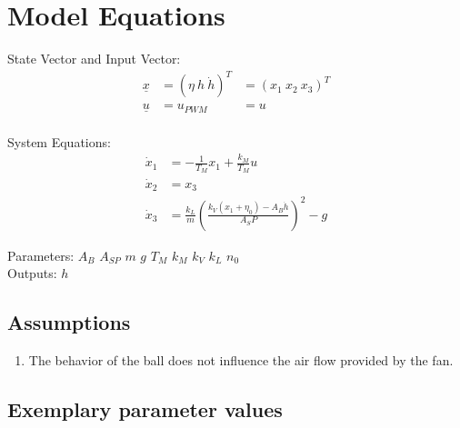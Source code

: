 \documentclass[10pt,a4paper]{article}
\begin{document}
	
	\section{Model Equations} %
	
	State Vector and Input Vector:
	\begin{align*}
	    \underline{x} &= (\eta \ h \ \dot{h})^T &= (x_1 \ x_2 \ x_3)^T \\
		\underline{u} &= u_{PWM} &= u \\
	\end{align*}
	
	\noindent System Equations:			
	\begin{subequations}
	\begin{align}
		\dot{x}_1 &= -\frac{1}{T_M}x_1 + \frac{k_M}{T_M}u\\
		\dot{x}_2 &= x_3 \\
		\dot{x}_3 &= \frac{k_L}{m}\left(\frac{k_V(x_1+\eta_0) - A_B\dot{h}}{A_SP}\right)^2 -g
	\end{align}
	\end{subequations}

	\noindent
	Parameters: $A_B$ $A_{SP}$ $m$ $g$ $T_M$ $k_M$ $k_V$ $k_L$ $n_0$ %
	\\
	Outputs: $h$ \\ 
	
	
	\subsection{Assumptions} %
		\begin{enumerate} %
			\item The behavior of the ball does not influence the air flow provided by the fan. 
		\end{enumerate}
	
	
	\subsection{Exemplary parameter values}
	
\end{document}
